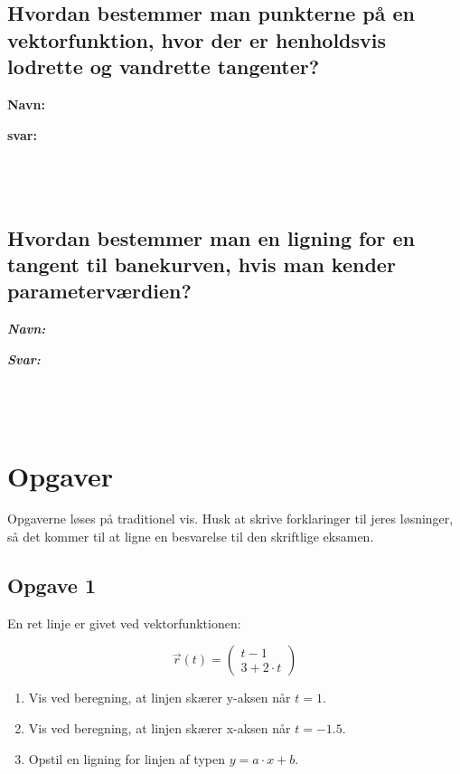 \documentclass[a4paper, 12pt]{article}
\begin{document}
\subsection*{Hvordan bestemmer man punkterne på en vektorfunktion, hvor der er henholdsvis lodrette og vandrette tangenter?}
\label{sec:orgbab4fa7}

\textbf{Navn:}

\textbf{svar:}

$$\phantom{a}$$

$$\phantom{a}$$

$$\phantom{a}$$
\subsection*{Hvordan bestemmer man en ligning for en tangent til banekurven, hvis man kender parameterværdien?}
\label{sec:org3620025}

\textbf{\emph{Navn:}}

\textbf{\emph{Svar:}}

$$\phantom{a}$$

$$\phantom{a}$$

$$\phantom{a}$$

\newpage
\section*{Opgaver}
\label{sec:org9a60b34}

Opgaverne løses på traditionel vis. Husk at skrive forklaringer til jeres løsninger, så det kommer til at ligne en besvarelse til den skriftlige eksamen.
\subsection*{Opgave 1}
\label{sec:orgaef1b89}

En ret linje er givet ved vektorfunktionen:

$$\vec{r}(t) = \begin{pmatrix} t -1 \\ 3+ 2 \cdot t\end{pmatrix}$$

\begin{enumerate}
\item Vis ved beregning, at linjen skærer y-aksen når \(t=1\).

\item Vis ved beregning, at linjen skærer x-aksen når \(t=-1.5\).

\item Opstil en ligning for linjen af typen \(y=a \cdot x + b\).
\end{enumerate}
\end{document}
